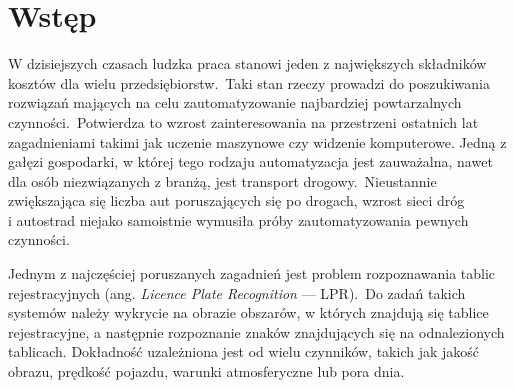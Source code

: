 %


\chapter*{Wstęp}

%
%

W dzisiejszych czasach ludzka praca stanowi jeden z największych składników kosztów dla wielu przedsiębiorstw.\ Taki stan rzeczy prowadzi do poszukiwania rozwiązań mających na celu zautomatyzowanie najbardziej powtarzalnych czynności.\ Potwierdza to wzrost zainteresowania na przestrzeni ostatnich lat zagadnieniami takimi jak uczenie maszynowe czy widzenie komputerowe.
Jedną z gałęzi gospodarki, w której tego rodzaju automatyzacja jest zauważalna, nawet dla osób niezwiązanych z branżą, jest transport drogowy.\ Nieustannie zwiększająca się liczba aut poruszających się po drogach, wzrost sieci dróg \\i autostrad niejako samoistnie wymusiła próby zautomatyzowania pewnych czynności.

Jednym z najczęściej poruszanych zagadnień jest problem rozpoznawania tablic rejestracyjnych (ang. \textit{Licence Plate Recognition} --- LPR).\ Do zadań takich systemów należy wykrycie na obrazie obszarów, w których znajdują się tablice rejestracyjne, a następnie rozpoznanie znaków znajdujących się na odnalezionych tablicach.
Dokładność uzależniona jest od wielu czynników, takich jak jakość obrazu, prędkość pojazdu, warunki atmosferyczne lub pora dnia.

